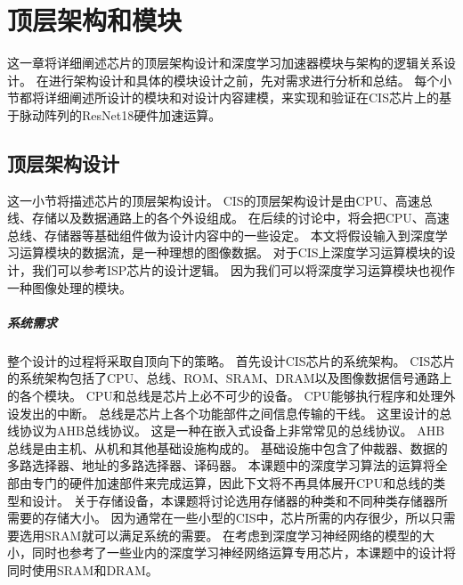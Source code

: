 
\chapter{顶层架构和模块}
这一章将详细阐述芯片的顶层架构设计和深度学习加速器模块与架构的逻辑关系设计。
在进行架构设计和具体的模块设计之前，先对需求进行分析和总结。
每个小节都将详细阐述所设计的模块和对设计内容建模，来实现和验证在CIS芯片上的基于脉动阵列的ResNet18硬件加速运算。


\section{顶层架构设计}
这一小节将描述芯片的顶层架构设计。
CIS的顶层架构设计是由CPU、高速总线、存储以及数据通路上的各个外设组成。
在后续的讨论中，将会把CPU、高速总线、存储器等基础组件做为设计内容中的一些设定。
本文将假设输入到深度学习运算模块的数据流，是一种理想的图像数据。
对于CIS上深度学习运算模块的设计，我们可以参考ISP芯片的设计逻辑。
因为我们可以将深度学习运算模块也视作一种图像处理的模块。  

\paragraph{系统需求}
整个设计的过程将采取自顶向下的策略。
首先设计CIS芯片的系统架构。
CIS芯片的系统架构包括了CPU、总线、ROM、SRAM、DRAM以及图像数据信号通路上的各个模块。
CPU和总线是芯片上必不可少的设备。
CPU能够执行程序和处理外设发出的中断。
总线是芯片上各个功能部件之间信息传输的干线。
这里设计的总线协议为AHB总线协议。
这是一种在嵌入式设备上非常常见的总线协议。
AHB总线是由主机、从机和其他基础设施构成的。
基础设施中包含了仲裁器、数据的多路选择器、地址的多路选择器、译码器。
本课题中的深度学习算法的运算将全部由专门的硬件加速部件来完成运算，因此下文将不再具体展开CPU和总线的类型和设计。
关于存储设备，本课题将讨论选用存储器的种类和不同种类存储器所需要的存储大小。
因为通常在一些小型的CIS中，芯片所需的内存很少，所以只需要选用SRAM就可以满足系统的需要。
在考虑到深度学习神经网络的模型的大小，同时也参考了一些业内的深度学习神经网络运算专用芯片，本课题中的设计将同时使用SRAM和DRAM。

